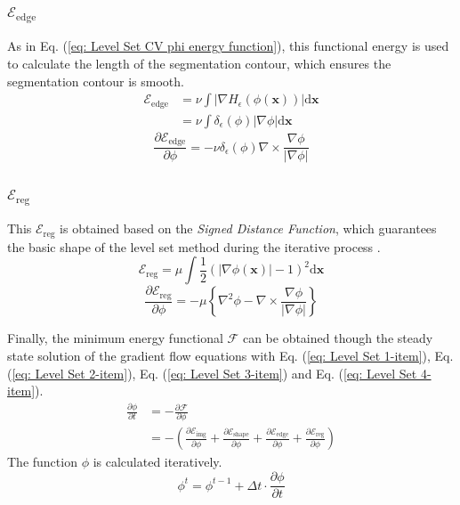 \subsubsection{$\mathcal{E}_{\text{edge}}$}
As in Eq. (\ref{eq: Level Set CV phi energy function}), this functional energy is used to calculate the length of the segmentation contour, which ensures the segmentation contour is smooth.
\begin{align}
    \mathcal{E}_{\text{edge}}
    & = \nu \int \left| \nabla H_\epsilon(\phi(\mathbf{x})) \right|\mathrm{d}\mathbf{x} \nonumber \\
    & = \nu \int \delta_\epsilon(\phi)|\nabla\phi|\mathrm{d}\mathbf{x}
\end{align}
\begin{equation}\label{eq: Level Set 3-item}
    \frac{\partial \mathcal{E}_{\text{edge}}}{\partial \phi} = - \nu \delta_\epsilon(\phi)\nabla \times \frac{\nabla \phi}{|\nabla \phi|}
\end{equation}

\subsubsection{$\mathcal{E}_{\text{reg}}$}
This $\mathcal{E}_{\text{reg}}$ is obtained based on the \emph{Signed Distance Function}, which guarantees the basic shape of the level set method during the iterative process \cite{LevelSet:mathod:li2005level, LevelSet:mathod:li2010distance}.
\begin{equation*}
    \mathcal{E}_{\text{reg}} = \mu \int \frac{1}{2} \left( |\nabla\phi(\mathbf{x})| -1 \right)^2\mathrm{d}\mathbf{x}
\end{equation*}
\begin{equation}\label{eq: Level Set 4-item}
    \frac{\partial \mathcal{E}_{\text{reg}}}{\partial \phi} = -\mu\left\{ \nabla^2\phi - \nabla \times \frac{\nabla\phi}{|\nabla\phi|} \right\}
\end{equation}

Finally, the minimum energy functional $\mathcal{F}$ can be obtained though the steady state solution of the gradient flow equations with Eq. (\ref{eq: Level Set 1-item}), Eq. (\ref{eq: Level Set 2-item}), Eq. (\ref{eq: Level Set 3-item}) and Eq. (\ref{eq: Level Set 4-item}).
\begin{align}
    \frac{\partial \phi}{\partial t}
    & = -\frac{\partial \mathcal{F}}{\partial \phi} \nonumber \\
    & = -\left( \frac{\partial \mathcal{E}_{\text{img}}}{\partial \phi}
        + \frac{\partial \mathcal{E}_{\text{shape}}}{\partial \phi}
        + \frac{\partial \mathcal{E}_{\text{edge}}}{\partial \phi}
        + \frac{\partial \mathcal{E}_{\text{reg}}}{\partial \phi} \right)
\end{align}
The function $\phi$ is calculated iteratively.
\begin{equation} \label{eq: iter Level Set}
    \phi^t = \phi^{t-1} + \Delta t \cdot \frac{\partial \phi}{\partial t}
\end{equation}

